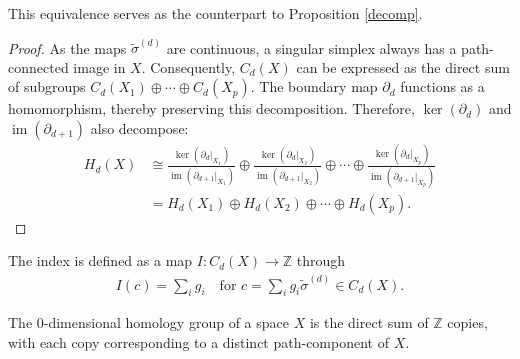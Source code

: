 This equivalence serves as the counterpart to Proposition \ref{decomp}.

\begin{proof}
	As the maps \( \tilde{\sigma}^{(d)} \) are continuous, a singular simplex always has a path-connected image in \( X \). Consequently, \( C_{d}(X) \) can be expressed as the direct sum of subgroups \( C_{d}(X_{1}) \oplus \cdots \oplus C_{d}(X_{p}) \). The boundary map \( \partial_d \) functions as a homomorphism, thereby preserving this decomposition. Therefore, \( \ker(\partial_{d}) \) and \( \operatorname{im}(\partial_{d+1}) \) also decompose:
	\begin{align}
		H_{d}(X) &\cong \frac{\ker(\partial_{d}\vert_{X_1})}{\operatorname{im}(\partial_{d+1}\vert_{X_1})} \oplus \frac{\ker(\partial_{d}\vert_{X_2})}{\operatorname{im}(\partial_{d+1}\vert_{X_2})} \oplus \cdots \oplus \frac{\ker(\partial_{d}\vert_{X_p})}{\operatorname{im}(\partial_{d+1}\vert_{X_p})} \nonumber \\
				 &= H_{d}(X_{1}) \oplus H_{d}(X_{2}) \oplus \cdots \oplus H_{d}(X_{p}). 
	\end{align}
\end{proof}

\begin{definition}[Index]
	The index is defined as a map \( I: C_{d}(X) \to \mathbb{Z} \) through
	\begin{align}
		I(c) = \sum_{i} g_{i} \quad \text{for } c = \sum_{i} g_{i} \tilde{\sigma}^{(d)} \in C_{d}(X). 
	\end{align}
\end{definition}

\begin{proposition}
	The \( 0 \)-dimensional homology group of a space \( X \) is the direct sum of \(\mathbb{Z}\) copies, with each copy corresponding to a distinct path-component of \( X \).
\end{proposition}

